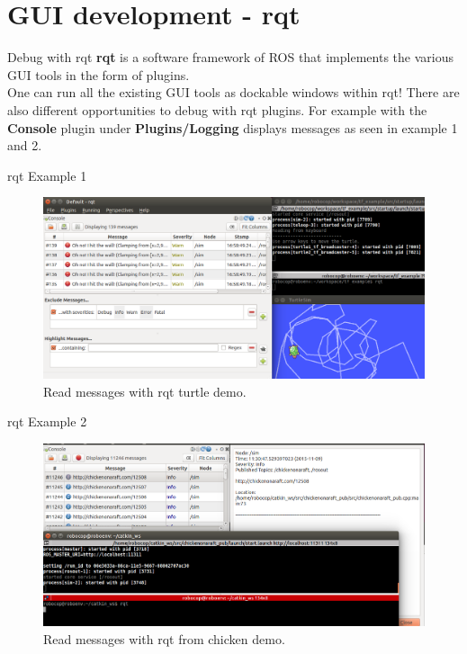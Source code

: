 \documentclass{beamer}
\begin{document}
\section{GUI development - rqt}
\begin{frame}{Debug with rqt}
	\textbf{rqt} is a software framework of ROS that implements the various GUI tools in the form of plugins. \\ One can run all the existing GUI tools as dockable windows within rqt!
	\newline
	\newline
	There are also different opportunities to debug with rqt plugins. For example with the \textbf{Console} plugin under \textbf{Plugins/Logging} displays messages as seen in example 1 and 2.
\end{frame}
\begin{frame}{rqt Example 1}
\begin{figure}[p]
	\centering
	\includegraphics[width=1\textwidth]{./images/rqt.png}
	\caption{Read messages with rqt turtle demo.}
	\label{fig::rqt}
\end{figure}
\end{frame}
\begin{frame}{rqt Example 2}
	\begin{figure}[p]
		\centering
		\includegraphics[width=1\textwidth]{./images/chickenrqt.png}
		\caption{Read messages with rqt from chicken demo.}
		\label{fig::rqt}
	\end{figure}
\end{frame}
\end{document}
